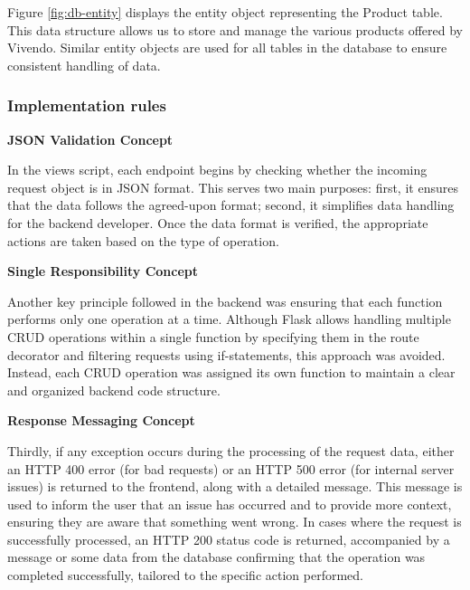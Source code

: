 Figure \ref{fig:db-entity} displays the entity object representing the Product table. This data structure allows us to store and manage the various products offered by Vivendo. Similar entity objects are used for all tables in the database to ensure consistent handling of data.

\subsubsection{Implementation rules}
\textbf{JSON Validation Concept}

In the views script, each endpoint begins by checking whether the incoming request object is in JSON format. This serves two main purposes: first, it ensures that the data follows the agreed-upon format; second, it simplifies data handling for the backend developer. Once the data format is verified, the appropriate actions are taken based on the type of operation.

\textbf{Single Responsibility Concept}

Another key principle followed in the backend was ensuring that each function performs only one operation at a time. Although Flask allows handling multiple CRUD operations within a single function by specifying them in the route decorator and filtering requests using if-statements, this approach was avoided. Instead, each CRUD operation was assigned its own function to maintain a clear and organized backend code structure.

\textbf{Response Messaging Concept}

Thirdly, if any exception occurs during the processing of the request data, either an HTTP 400 error (for bad requests) or an HTTP 500 error (for internal server issues) is returned to the frontend, along with a detailed message. This message is used to inform the user that an issue has occurred and to provide more context, ensuring they are aware that something went wrong. In cases where the request is successfully processed, an HTTP 200 status code is returned, accompanied by a message or some data from the database confirming that the operation was completed successfully, tailored to the specific action performed.